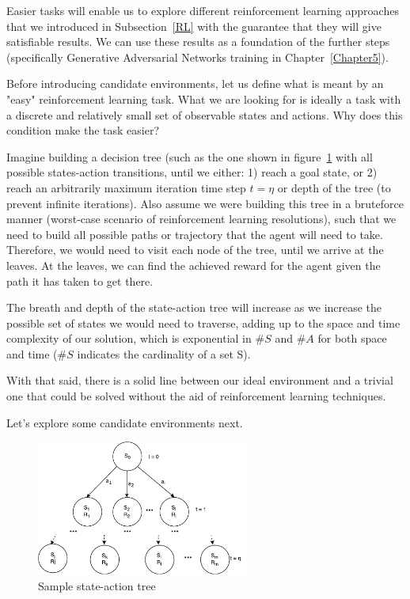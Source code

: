 Easier tasks will enable us to explore different reinforcement learning approaches that we introduced in Subsection~\ref{RL} with the guarantee that they will give satisfiable results. We can use these results as a foundation of the further steps (specifically Generative Adversarial Networks training in Chapter~\ref{Chapter5}).

Before introducing candidate environments, let us define what is meant by an "easy" reinforcement learning task. What we are looking for is ideally a task with a discrete and relatively small set of observable states and actions. Why does this condition make the task easier?

Imagine building a decision tree (such as the one shown in figure~\ref{fig:RLTree} with all possible states-action transitions, until we either: 1) reach a goal state, or 2) reach an arbitrarily maximum iteration time step $t = \eta$ or depth of the tree (to prevent infinite iterations). Also assume we were building this tree in a bruteforce manner (worst-case scenario of reinforcement learning resolutions), such that we need to build all possible paths or trajectory that the agent will need to take. Therefore, we would need to visit each node of the tree, until we arrive at the leaves. At the leaves, we can find the achieved reward for the agent given the path it has taken to get there. 

The breath and depth of the state-action tree will increase as we increase the possible set of states we would need to traverse, adding up to the space and time complexity of our solution, which is exponential in $\#S$ and $\#A$ for both space and time ($\#S$ indicates the cardinality of a set S).

With that said, there is a solid line between our ideal environment and a trivial one that could be solved without the aid of reinforcement learning techniques.

Let's explore some candidate environments next.
\begin{figure}
\centering
\includegraphics[width=7cm]{Figures/RLTree}
\caption{Sample state-action tree}
\label{fig:RLTree}
\end{figure}

